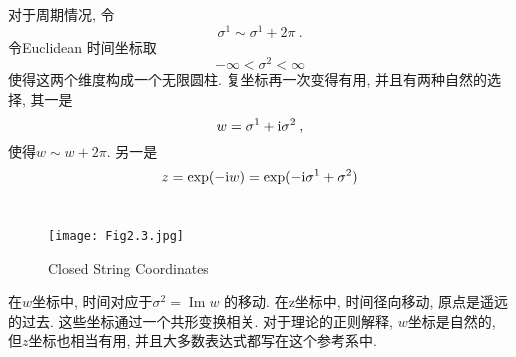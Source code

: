 对于周期情况, 令
\begin{equation}
\sigma^{1} \sim \sigma^{1}+2 \pi \:. \label{2.6.1}
\end{equation}
令Euclidean 时间坐标取
\begin{equation}
-\infty<\sigma^{2}<\infty \label{2.6.2}
\end{equation}
使得这两个维度构成一个无限圆柱. 复坐标再一次变得有用, 并且有两种自然的选择, 其一是
\begin{equation}
w=\sigma^{1}+ \mathrm{i} \sigma^{2} \:,  \label{2.6.3}
\end{equation}
使得$w \sim w+2 \pi$.
另一是
\begin{equation}
z=\exp (-\mathrm{i} w)=\exp (-\mathrm{i} \sigma^{1}+\sigma^{2})
\end{equation}
\\
\begin{figure}[h]
\begin{center}
	\texttt{[image: Fig2.3.jpg]}\\
	\caption{Closed String Coordinates}
\end{center}
\end{figure}

在$w$坐标中, 时间对应于$\sigma^{2}=\operatorname{Im} w$ 的移动. 在z坐标中, 时间径向移动, 原点是遥远的过去. 这些坐标通过一个共形变换相关. 对于理论的正则解释, $w$坐标是自然的, 但$z$坐标也相当有用, 并且大多数表达式都写在这个参考系中.

